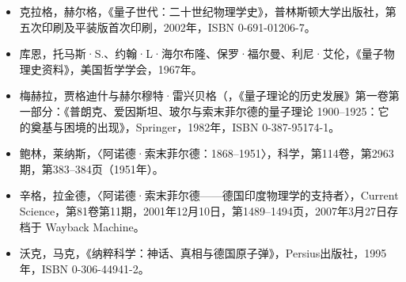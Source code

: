 \begin{itemize}
\item 克拉格，赫尔格，《量子世代：二十世纪物理学史》，普林斯顿大学出版社，第五次印刷及平装版首次印刷，2002年，ISBN 0-691-01206-7。
\item 库恩，托马斯·S.、约翰·L·海尔布隆、保罗·福尔曼、利尼·艾伦，《量子物理史资料》，美国哲学学会，1967年。
\item 梅赫拉，贾格迪什与赫尔穆特·雷兴贝格（，《量子理论的历史发展》第一卷第一部分：《普朗克、爱因斯坦、玻尔与索末菲尔德的量子理论 1900–1925：它的奠基与困境的出现》，Springer，1982年，ISBN 0-387-95174-1。
\item 鲍林，莱纳斯，〈阿诺德·索末菲尔德：1868–1951〉，科学，第114卷，第2963期，第383–384页（1951年）。
\item 辛格，拉金德，〈阿诺德·索末菲尔德——德国印度物理学的支持者〉，Current Science，第81卷第11期，2001年12月10日，第1489–1494页，2007年3月27日存档于 Wayback Machine。
\item 沃克，马克，《纳粹科学：神话、真相与德国原子弹》，Persius出版社，1995年，ISBN 0-306-44941-2。
\end{itemize}